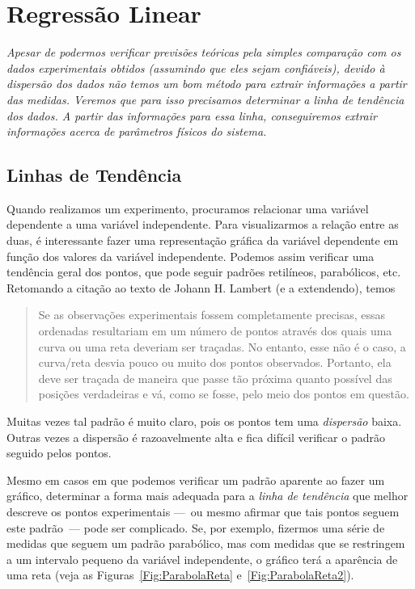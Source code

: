\chapter{Regressão Linear}
\label{Chap:RegressoLinear}

\begin{fullwidth}
{\it
Apesar de podermos verificar previsões teóricas pela simples comparação com os dados experimentais obtidos (assumindo que eles sejam confiáveis), devido à dispersão dos dados não temos um bom método para extrair informações a partir das medidas. Veremos que para isso precisamos determinar a linha de tendência dos dados. A partir das informações para essa linha, conseguiremos extrair informações acerca de parâmetros físicos do sistema.
}
\end{fullwidth}

\section{Linhas de Tendência}

Quando realizamos um experimento, procuramos relacionar uma variável dependente a uma variável independente. Para visualizarmos a relação entre as duas, é interessante fazer uma representação gráfica da variável dependente em função dos valores da variável independente. Podemos assim verificar uma tendência geral dos pontos, que pode seguir padrões retilíneos, parabólicos, etc. Retomando a citação ao texto de Johann H. Lambert (e a extendendo), temos\cite{Lambert}
\begin{quote}
Se as observações experimentais fossem completamente precisas, essas ordenadas resultariam em um número de pontos através dos quais uma curva ou uma reta deveriam ser traçadas. No entanto, esse não é o caso, a curva/reta desvia pouco ou muito dos pontos observados. Portanto, ela deve ser traçada de maneira que passe tão próxima quanto possível das posições verdadeiras e vá, como se fosse, pelo meio dos pontos em questão.
\end{quote}
%
Muitas vezes tal padrão é muito claro, pois os pontos tem uma \emph{dispersão} baixa. Outras vezes a dispersão é razoavelmente alta e fica difícil verificar o padrão seguido pelos pontos.

Mesmo em casos em que podemos verificar um padrão aparente ao fazer um gráfico, determinar a forma mais adequada para a \emph{linha de tendência} que melhor descreve os pontos experimentais ---~ou mesmo afirmar que tais pontos seguem este padrão~--- pode ser complicado. Se, por exemplo, fizermos uma série de medidas que seguem um padrão parabólico, mas com medidas que se restringem a um intervalo pequeno da variável independente, o gráfico terá a aparência de uma reta (veja as Figuras~\ref{Fig:ParabolaReta} e~\ref{Fig:ParabolaReta2}).
\begin{figure*}
\centering
\forceversofloat
\caption{Gráfico de um conjunto de pontos que aparentemente seguem uma tendência linear. Veja também a Figura~\ref{Fig:ParabolaReta2}.}
\label{Fig:ParabolaReta}

\end{figure*}

